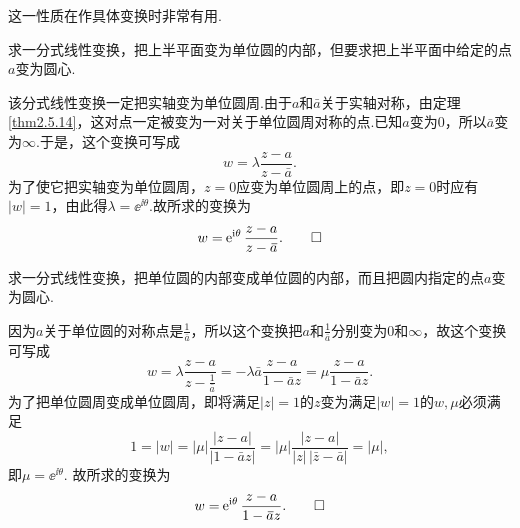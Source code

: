 这一性质在作具体变换时非常有用.
\begin{example}\label{exam2.5.15}
  求一分式线性变换，把上半平面变为单位圆的内部，但要求把上半平面中给定的点$a$变为圆心.
\end{example}
\begin{solution}
  该分式线性变换一定把实轴变为单位圆周.由于$a$和$\bar a$关于实轴对称，由定理 \ref{thm2.5.14}，这对点一定被变为一对关于单位圆周对称的点.已知$a$变为$0$，所以$\bar a$变为$\infty$.于是，这个变换可写成
  \[
    w = \lambda\frac{z-a}{z-\bar a}.
  \]
  为了使它把实轴变为单位圆周，$z=0$应变为单位圆周上的点，即$z=0$时应有$|w|=1$，由此得$\lambda=\ee^{\ii\theta}$.故所求的变换为
  \[
    w = \operatorname{\!\!\;\mathrm e}^{\mathrm i\theta} \frac{z-a}{z-{}\mkern2mu\overline{\mkern-2mua}}. \qedhere
  \]
\end{solution}

\begin{example}\label{exam2.5.16}
  求一分式线性变换，把单位圆的内部变成单位圆的内部，而且把圆内指定的点$a$变为圆心.
\end{example}
\begin{solution}
  因为$a$关于单位圆的对称点是$\frac1{\bar a}$，所以这个变换把$a$和$\frac1{\bar a}$分别变为$0$和$\infty$，故这个变换可写成
  \[
    w = \lambda\frac{z-a}{z-\frac1{\bar a}} = -\lambda\bar a\frac{z-a}{1-\bar az} = \mu\frac{z-a}{1-\bar az}.
  \]
  为了把单位圆周变成单位圆周，即将满足$|z|=1$的$z$变为满足$|w|=1$的$w,\mu$必须满足
  \[
    1 = |w| = |\mu|\frac{|z-a|}{|1-\bar az|} = |\mu|\frac{|z-a|}{|z|\,|\bar z-\bar a|} = |\mu|,
  \]
  即$\mu=\ee^{\ii\theta}$. 故所求的变换为
  \[
    w = \operatorname{\!\!\;\mathrm e}^{\mathrm i\theta}\frac{z-a}{1-{}\mkern2mu\overline{\mkern-2mua}z}. \qedhere
  \]
\end{solution}

